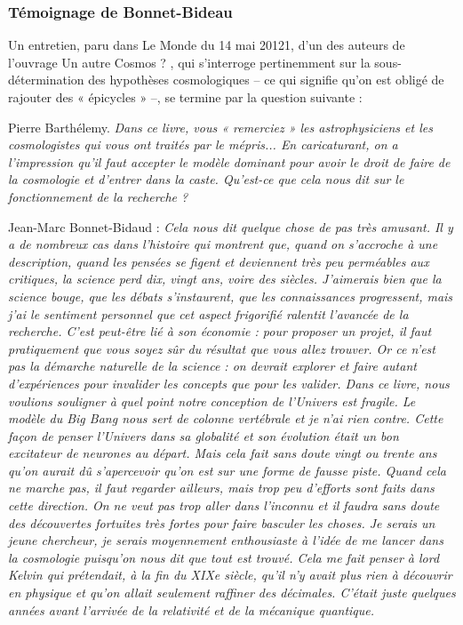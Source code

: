 \documentclass[a4paper,12pt]{article}
\begin{document}
\subsubsection{Témoignage de Bonnet-Bideau}

Un entretien,  paru dans Le Monde du 14 mai 20121, d'un des auteurs de l'ouvrage Un autre Cosmos ? , qui s'interroge pertinemment sur la sous-détermination des hypothèses cosmologiques – ce qui signifie qu'on est obligé de rajouter des « épicycles » –, se termine par la question suivante :

Pierre Barthélemy. \textit{Dans ce livre, vous « remerciez » les astrophysiciens et les cosmologistes qui vous ont traités par le mépris... En caricaturant, on a l'impression qu'il faut accepter le modèle dominant pour avoir le droit de faire de la cosmologie et d'entrer dans la caste. Qu'est-ce que cela nous dit sur le fonctionnement de la recherche ?}

Jean-Marc Bonnet-Bidaud : \textit{Cela nous dit quelque chose de pas très amusant. Il y a de nombreux cas dans l'histoire qui montrent que, quand on s'accroche à une description, quand les pensées se figent et deviennent très peu perméables aux critiques, la science perd dix, vingt ans, voire des siècles. J'aimerais bien que la science bouge, que les débats s'instaurent, que les connaissances progressent, mais j'ai le sentiment personnel que cet aspect frigorifié ralentit l'avancée de la recherche. C'est peut-être lié à son économie : pour proposer un projet, il faut pratiquement que vous soyez sûr du résultat que vous allez trouver. Or ce n'est pas la démarche naturelle de la science : on devrait explorer et faire autant d'expériences pour invalider les concepts que pour les valider. Dans ce livre, nous voulions souligner à quel point notre conception de l'Univers est fragile. Le modèle du Big Bang nous sert de colonne vertébrale et je n’ai rien contre. Cette façon de penser l'Univers dans sa globalité et son évolution était un bon excitateur de neurones au départ. Mais cela fait sans doute vingt ou trente ans qu'on aurait dû s'apercevoir qu'on est sur une forme de fausse piste. Quand cela ne marche pas, il faut regarder ailleurs, mais trop peu d'efforts sont faits dans cette direction. On ne veut pas trop aller dans l'inconnu et il faudra sans doute des découvertes fortuites très fortes pour faire basculer les choses. Je serais un jeune chercheur, je serais moyennement enthousiaste à l'idée de me lancer dans la cosmologie puisqu'on nous dit que tout est trouvé. Cela me fait penser à lord Kelvin qui prétendait, à la fin du XIXe siècle, qu'il n'y avait plus rien à découvrir en physique et qu'on allait seulement raffiner des décimales. C'était juste quelques années avant l'arrivée de la relativité et de la mécanique quantique.}
\end{document}

